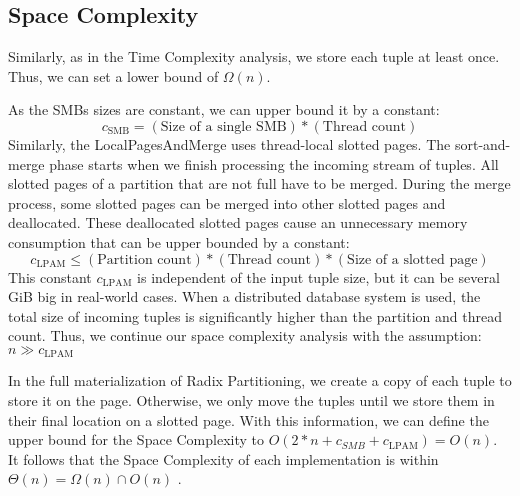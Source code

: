 \subsection{Space Complexity}\label{section-space-complexity}
Similarly, as in the Time Complexity analysis, we store each tuple at least once.
Thus, we can set a lower bound of $\Omega(n)$.

As the \acfp{SMB} sizes are constant, we can upper bound it by a constant:
\begin{equation}
  c_\textrm{SMB} = (\textrm{Size of a single SMB}) * (\textrm{Thread count})
\end{equation}
Similarly, the LocalPagesAndMerge uses thread-local slotted pages.
The sort-and-merge phase starts when we finish processing the incoming stream of tuples.
All slotted pages of a partition that are not full have to be merged.
During the merge process, some slotted pages can be merged into other slotted pages and deallocated.
These deallocated slotted pages cause an unnecessary memory consumption that can be upper bounded by a constant:
\begin{equation}
  c_\textrm{LPAM} \leq (\textrm{Partition count}) * (\textrm{Thread count}) * (\textrm{Size of a slotted page})
\end{equation}
This constant $c_\textrm{LPAM}$ is independent of the input tuple size, but it can be several GiB big in real-world cases.
When a distributed database system is used, the total size of incoming tuples is significantly higher than the partition and thread count.
Thus, we continue our space complexity analysis with the assumption: $n \gg c_\textrm{LPAM} $

In the full materialization of Radix Partitioning, we create a copy of each tuple to store it on the page.
Otherwise, we only move the tuples until we store them in their final location on a slotted page.
With this information, we can define the upper bound for the Space Complexity to $O(2 * n + c_{SMB} + c_\textrm{LPAM}) = O(n)$.
It follows that the Space Complexity of each implementation is within $\Theta(n) = \Omega(n) \cap O(n) $ .
